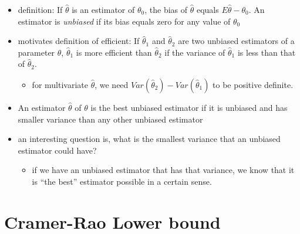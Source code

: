 \begin{itemize}
\item definition: If $\hat \theta$ is an estimator of $\theta_0$,
       the bias of $\hat \theta$ equals $E \hat \theta - \theta_0$.
       An estimator is \emph{unbiased} if its bias equals zero for any
       value of $\theta_0$
\item motivates definition of efficient: If $\hat \theta_1$ and $\hat
       \theta_2$ are two unbiased estimators of a parameter $\theta$,
       $\hat \theta_1$ is more efficient than $\hat \theta_2$ if the
       variance of $\hat \theta_1$ is less than that of $\hat \theta_2$.
\begin{itemize}
\item for multivariate $\hat\theta$, we need $Var(\hat\theta_2) -
         Var(\hat\theta_1)$ to be positive definite.
\end{itemize}
\item An estimator $\hat\theta$ of $\theta$ is the best unbiased
       estimator if it is unbiased and has smaller variance than any
       other unbiased estimator
\item an interesting question is, what is the smallest variance that
       an unbiased estimator could have?
\begin{itemize}
\item if we have an unbiased estimator that has that variance, we
         know that it is ``the best'' estimator possible in a certain sense.
\end{itemize}
\end{itemize}

\section{Cramer-Rao Lower bound}

